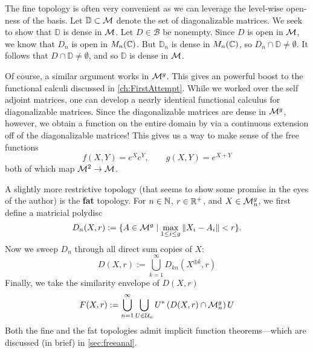 \begin{example}%
\label{ex:context}
  The fine topology is often very convenient as we can leverage the level-wise
  open-ness of the basis. Let \(\mathbb{D} \subset \mathcal{M} \) denote the set of
  diagonalizable matrices. We seek to show that \(\mathbb{D}\) is dense in
  \(\mathcal{M}\). Let \(D \in \mathcal{B}\) be nonempty. Since \(D\) is open in
  \(\mathcal{M}\), we know that \(D_n\) is open in \(M_n(\mathbb{C})\). But \(\mathbb{D}_n\) is
  dense in \(M_n(\mathbb{C})\), so \(D_n \cap \mathbb{D} \neq \emptyset\). It follows
  that \(D \cap \mathbb{D} \neq \emptyset\), and so \(\mathbb{D}\) is dense in
  \(\mathcal{M}\).

  Of course, a similar argument works in \(\mathcal{M}^{g} \). This gives an powerful
  boost to the functional calculi discussed in \cref{ch:FirstAttempt}. While we
  worked over the self adjoint matrices, one can develop a nearly identical
  functional calculus for diagonalizable matrices. Since the diagonalizable
  matrices are dense in \(\mathcal{M}^{g} \), however, we obtain a function on the
  entire domain by via a continuous extension off of the diagonalizable
  matrices! This gives us a way to make sense of the free functions
  \[
    f(X,Y)=e^Xe^Y, \qquad g(X,Y)=e^{X+Y}
  \]
  both of which map \(\mathcal{M}^{2} \to \mathcal{M}\).
\end{example}

A slightly more restrictive topology (that seems to show some promise in the eyes
of the author) is the \textbf{fat} topology. For \(n \in \mathbb{N} \),
\(r \in \mathbb{R} ^+\), and \(X \in \mathcal{M}^g_n\), we first define a matricial polydisc
\[
  D_n(X,r) := \{A \in \mathcal{M}^g \mid \max_{1\leq i\leq g} \| X_i-A_i \| <r\}.
\]
Now we sweep \(D_n\) through all direct sum copies of \(X\):
\[
  D(X,r) := \bigcup_{k=1}^\infty D_{kn} (X^{\oplus k},r)
\]
Finally, we take the similarity envelope of \(D(X,r)\)
\[
  F(X,r) :=  \bigcup_{n=1}^\infty \bigcup_{U \in \mathcal{U}_n} U^* \left( D(X,r) \cap \mathcal{M}^g_n \right) U
\]
Both the fine and the fat topologies admit implicit function theorems---which
are discussed (in brief) in \cref{sec:freeanal}.

